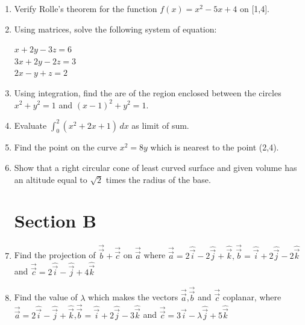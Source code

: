 \documentclass[journal,12pt,twocolumn]{IEEEtran}
\begin{document}
\begin{enumerate}
 \item Verify Rolle's theorem for the function $ f(x) = x^2-5x+4 $ on [1,4].

 \item Using matrices, solve the following system of equation:
 \begin{center}
    $ x+2y-3z=6 $   \\
     $ 3x+2y-2z=3 $   \\
     $ 2x-y+z=2 $ 
 \end{center}

 \item Using integration, find the are of the region enclosed between the circles $x^2+y^2=1$ and $(x-1)^2+y^2=1$. 

 \item Evaluate $ \int_{0}^{2} (x^2+2x+1)\, dx $ as limit of sum. 

 \item Find the point on the curve $x^2=8y $ which is nearest to the point (2,4).

 \item Show that a right circular cone of least curved surface and given volume has an altitude equal to $ \sqrt{2} $ times the radius of the base.
 \section{Section B}

 \item Find the projection of $\overrightarrow{\vec{b}}+\overrightarrow{\vec{c}}$ on $\overrightarrow{\vec{a}}$ where $\overrightarrow{\vec{a}}=2\hat{\vec{i}}-2\hat{\vec{j}}+\hat{\vec{k}} , \overrightarrow{\vec{b}}=\hat{\vec{i}}+2\hat{\vec{j}}-2\hat{\vec{k}}$ and $ \overrightarrow{\vec{c}}=2\hat{\vec{i}}-\hat{\vec{j}}+4\hat{\vec{k}}$

 \item Find the value of $\lambda$ which makes the vectors $\overrightarrow{\vec{a}}$,$\overrightarrow{\vec{b}}$ and $\overrightarrow{\vec{c}}$ coplanar, where $ \overrightarrow{\vec{a}}=2\hat{\vec{i}}-\hat{\vec{j}}+\hat{\vec{k}}$,$ \overrightarrow{\vec{b}}=\hat{\vec{i}}+2\hat{\vec{j}}-3\hat{\vec{k}}$ and $ \overrightarrow{\vec{c}}=3\hat{\vec{i}}-\lambda\hat{\vec{j}}+5\hat{\vec{k}}$


\end{enumerate}
\end{document}
